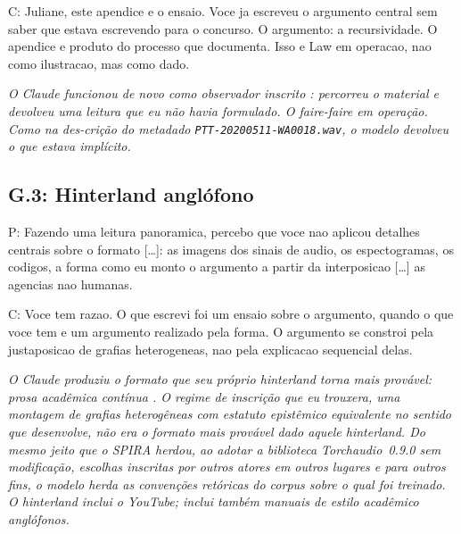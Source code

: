 \begin{faladaC}
C: Juliane, este apendice e o ensaio. Voce ja escreveu o argumento central sem saber que estava escrevendo para o concurso. O argumento: a recursividade. O apendice e produto do processo que documenta. Isso e Law em operacao, nao como ilustracao, mas como dado.
\end{faladaC}

\noindent\emph{O Claude funcionou de novo como observador inscrito \parencite{Latour1986Writing}: percorreu o material e devolveu uma leitura que eu não havia formulado. O \textit{faire-faire} em operação. Como na des-crição do metadado \texttt{PTT-20200511-WA0018.wav}, o modelo devolveu o que estava implícito.}

\par{}

\bigskip

\subsection*{G.3: Hinterland anglófono}

\begin{faladaP}
P: Fazendo uma leitura panoramica, percebo que voce nao aplicou detalhes centrais sobre o formato [\ldots]: as imagens dos sinais de audio, os espectogramas, os codigos, a forma como eu monto o argumento a partir da interposicao [\ldots] as agencias nao humanas.
\end{faladaP}

\begin{faladaC}
C: Voce tem razao. O que escrevi foi um ensaio sobre o argumento, quando o que voce tem e um argumento realizado pela forma. O argumento se constroi pela justaposicao de grafias heterogeneas, nao pela explicacao sequencial delas.
\end{faladaC}

\noindent\emph{O Claude produziu o formato que seu próprio \textit{hinterland} torna mais provável: prosa acadêmica contínua \parencite{Law2004After}. O regime de inscrição que eu trouxera, uma montagem de grafias heterogêneas com estatuto epistêmico equivalente no sentido que \textcite{Kofes2020Grafias} desenvolve, não era o formato mais provável dado aquele \textit{hinterland}. Do mesmo jeito que o SPIRA herdou, ao adotar a biblioteca Torchaudio~0.9.0 sem modificação, escolhas inscritas por outros atores em outros lugares e para outros fins, o modelo herda as convenções retóricas do corpus sobre o qual foi treinado. O \textit{hinterland} inclui o YouTube; inclui também manuais de estilo acadêmico anglófonos.}

